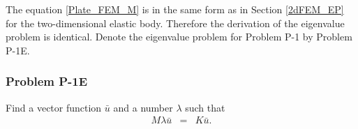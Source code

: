 \documentclass[../../main.tex]{subfiles}
\begin{document}
The equation \eqref{Plate_FEM_M} is in the same form as in Section \ref{2dFEM_EP} for the two-dimensional elastic body. Therefore the derivation of the eigenvalue problem is identical. Denote the eigenvalue problem for Problem P-1 by Problem P-1E.
\subsubsection{Problem P-1E}
Find a vector function $\bar{u}$ and a number $\lambda$ such that
\begin{eqnarray}
	M\lambda{\bar{u}} & = & K\bar{u}.
\end{eqnarray}
\end{document}
